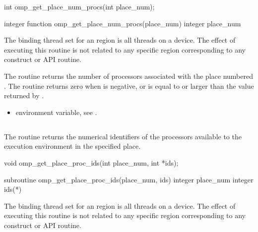 \format
\ccppspecificstart
\begin{boxedcode}
int omp\_get\_place\_num\_procs(int place\_num);
\end{boxedcode}
\ccppspecificend

\fortranspecificstart
\begin{boxedcode}
integer function omp\_get\_place\_num\_procs(place\_num)
integer place\_num
\end{boxedcode}
\fortranspecificend

\binding
The binding thread set for an   region is all threads on a device. The effect of executing this routine is not related to any specific region corresponding to any construct or API routine.

\effect
The  routine returns the number of processors associated with the place numbered . The routine returns zero when  is negative, or is equal to or larger than the value returned by . 

\crossreferences
\begin{itemize}
\item {} environment variable, see 
.
\end{itemize}




\subsection{}
\label{subsec:omp_get_place_proc_ids}

\summary
The  routine returns the numerical identifiers of the processors available to the execution environment in the specified place.

\format
\ccppspecificstart
\begin{boxedcode}
void omp\_get\_place\_proc\_ids(int place\_num, int *ids);
\end{boxedcode}
\ccppspecificend

\fortranspecificstart
\begin{boxedcode}
subroutine omp\_get\_place\_proc\_ids(place_num, ids)
integer place\_num
integer ids(*)
\end{boxedcode}
\fortranspecificend

\binding
The binding thread set for an  region is all 
threads on a device. The effect of executing this routine is not related to 
any specific region corresponding to any construct or API routine.

